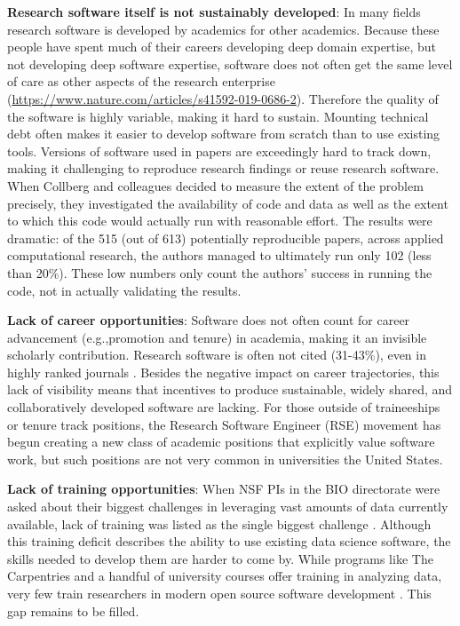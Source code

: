 \documentclass[
]{book}
\begin{document}
\textbf{Research software itself is not sustainably developed}: In many fields research software is developed by academics for other academics. Because these people have spent much of their careers developing deep domain expertise, but not developing deep software expertise, software does not often get the same level of care as other aspects of the research enterprise
(\url{https://www.nature.com/articles/s41592-019-0686-2}). Therefore the quality of the software is highly variable, making it hard to sustain. Mounting technical debt often makes it easier to develop software from scratch than to use existing tools. Versions of software used in papers are exceedingly hard to track down, making it challenging to reproduce research findings or reuse research software. When Collberg and colleagues \citep{collberg2014measuring, collberg2015repeatability} decided to measure the extent of the problem precisely, they investigated the availability of code and data as well as the extent to which this code would actually run with reasonable effort. The results were dramatic: of the 515 (out of 613) potentially reproducible papers, across applied computational research, the authors managed to ultimately run only 102 (less than 20\%). These low numbers only count the authors' success in running the code, not in actually validating the results.

\textbf{Lack of career opportunities}: Software does not often count for career advancement (e.g.,promotion and tenure) in academia, making it an invisible scholarly contribution. Research software is often not cited (31-43\%), even in highly ranked journals \citep{howison2016software}. Besides the negative impact on career trajectories, this lack of visibility means that incentives to produce sustainable, widely shared, and collaboratively developed software are lacking. For those outside of traineeships or tenure track positions, the Research Software Engineer (RSE) movement has begun creating a new class of academic positions that explicitly value software work, but such positions are not very common in universities the United States.

\textbf{Lack of training opportunities}: When NSF PIs in the BIO directorate were asked about their biggest challenges in leveraging vast amounts of data currently available, lack of training was listed as the single biggest challenge \citep{barone2017unmet}. Although this training deficit describes the ability to use existing data science software, the skills needed to develop them are harder to come by. While programs like The Carpentries and a handful of university courses offer training in analyzing data, very few train researchers in modern open source software development \citep{Hettrick-blog, hettrick2014, nangia_katz_2017}. This gap remains to be filled.
\end{document}
